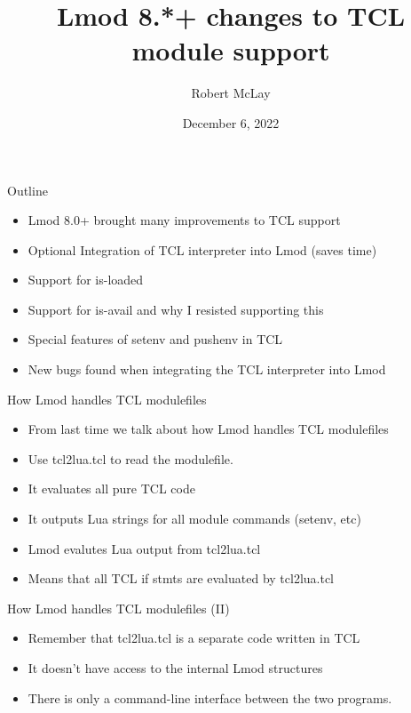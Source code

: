 \documentclass{beamer}
\begin{document}
\title[Lmod]{Lmod 8.*+ changes to TCL module support}
\author{Robert McLay} 
\date{December 6, 2022}

\frame{\titlepage} 


\begin{frame}{Outline}
  \begin{itemize}
    \item Lmod 8.0+ brought many improvements to TCL support
    \item Optional Integration of TCL interpreter into Lmod (saves
      time)
    \item Support for is-loaded 
    \item Support for is-avail and why I resisted supporting this
    \item Special features of setenv and pushenv in TCL
    \item New bugs found when integrating the TCL interpreter into Lmod
  \end{itemize}
\end{frame}

\begin{frame}{How Lmod handles TCL modulefiles}
  \begin{itemize}
    \item From last time we talk about how Lmod handles TCL
      modulefiles
    \item Use tcl2lua.tcl to read the modulefile.
    \item It evaluates all pure TCL code
    \item It outputs Lua strings for all module commands (setenv, etc)
    \item Lmod evalutes Lua output from tcl2lua.tcl
    \item Means that all TCL if stmts are evaluated by tcl2lua.tcl
  \end{itemize}
\end{frame}

\begin{frame}{How Lmod handles TCL modulefiles (II)}
  \begin{itemize}
    \item Remember that tcl2lua.tcl is a separate code written in TCL
    \item It doesn't have access to the internal Lmod structures
    \item There is only a command-line interface between the two programs.
  \end{itemize}
\end{frame}
\end{document}
